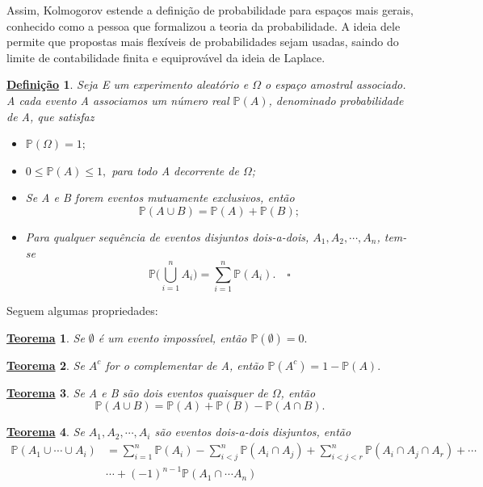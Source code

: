 \documentclass{article}
\newtheorem*{def*}{\underline{Defini\c c\~ao}}
\newtheorem*{theorem*}{\underline{Teorema}}
\begin{document}
  Assim, Kolmogorov estende a definição de probabilidade para espaços mais gerais, conhecido como a pessoa que formalizou a teoria da probabilidade. A ideia dele permite que
propostas mais flexíveis de probabilidades sejam usadas, saindo do limite de contabilidade finita e equiprovável da ideia de Laplace.
\begin{def*}
  Seja E um experimento aleatório e \(\Omega \) o espaço amostral associado. A cada evento A associamos um número real
 \(\mathbb{P}(A)\), denominado probabilidade de A, que satisfaz 
\begin{itemize}
  \item[P1)] \(\mathbb{P}(\Omega )=1;\)
    \item[P2)] \(0\leq \mathbb{P}(A)\leq 1,\) para todo A decorrente de \(\Omega \);
      \item[P3)] Se A e B forem eventos mutuamente exclusivos, então 
        \[
          \mathbb{P}(A\cup B) = \mathbb{P}(A) + \mathbb{P}(B);
        \]
      \item[P4)] Para qualquer sequência de eventos disjuntos dois-a-dois, \(A_{1}, A_{2}, \cdots, A_{n}\), tem-se 
        \[
          \mathbb{P}\biggl(\bigcup_{i=1}^{n}A_{i}\biggr) = \sum\limits_{i=1}^{n}\mathbb{P}(A_{i}).\quad \square
        \]
\end{itemize}
\end{def*}
  Seguem algumas propriedades:
 \begin{theorem*}
   Se \(\emptyset\) é um evento impossível, então \(\mathbb{P}(\emptyset) = 0.\)
 \end{theorem*}
 \begin{theorem*}
  Se \(A^{c}\) for o complementar de A, então \(\mathbb{P}(A^{c}) = 1 - \mathbb{P}(A).\)
 \end{theorem*}
\begin{theorem*}
  Se A e B são dois eventos quaisquer de \(\Omega \), então 
    \[
      \mathbb{P}(A\cup B) = \mathbb{P}(A) + \mathbb{P}(B) - \mathbb{P}(A\cap B).
    \]
\end{theorem*}
\begin{theorem*}
  Se \(A_{1}, A_{2}, \cdots, A_{i}\) são eventos dois-a-dois disjuntos, então 
  \begin{align*}
    \mathbb{P}(A_{1}\cup \cdots\cup A_{i}) &= \sum\limits_{i=1}^{n}\mathbb{P}(A_{i}) - \sum\limits_{i < j}^{n} \mathbb{P}(A_{i}\cap A_{j}) + \sum\limits_{i < j < r}^{n} \mathbb{P}(A_{i}\cap A_{j}\cap A_{r}) + \cdots\\
                                           &\cdots + (-1)^{n-1}\mathbb{P}(A_{1}\cap \cdots A_{n})
  \end{align*}
\end{theorem*}
\end{document}
